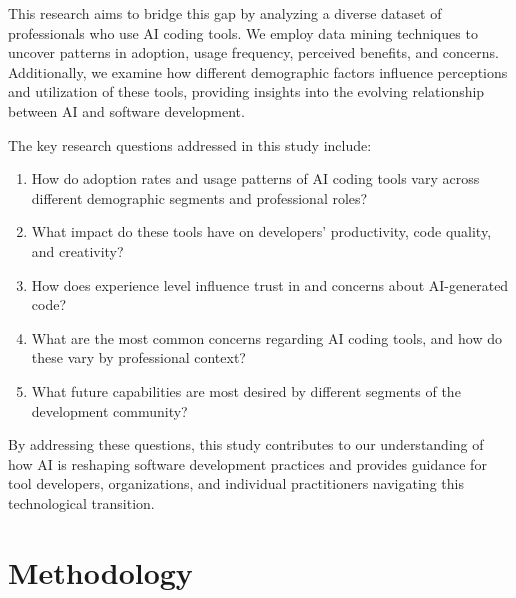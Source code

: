\documentclass[conference]{IEEEtran}
\begin{document}
This research aims to bridge this gap by analyzing a diverse dataset of professionals who use AI coding tools. We employ data mining techniques to uncover patterns in adoption, usage frequency, perceived benefits, and concerns. Additionally, we examine how different demographic factors influence perceptions and utilization of these tools, providing insights into the evolving relationship between AI and software development.

The key research questions addressed in this study include:
\begin{enumerate}
    \item How do adoption rates and usage patterns of AI coding tools vary across different demographic segments and professional roles?
    \item What impact do these tools have on developers' productivity, code quality, and creativity?
    \item How does experience level influence trust in and concerns about AI-generated code?
    \item What are the most common concerns regarding AI coding tools, and how do these vary by professional context?
    \item What future capabilities are most desired by different segments of the development community?
\end{enumerate}

By addressing these questions, this study contributes to our understanding of how AI is reshaping software development practices and provides guidance for tool developers, organizations, and individual practitioners navigating this technological transition.

\section{Methodology}
\end{document}
